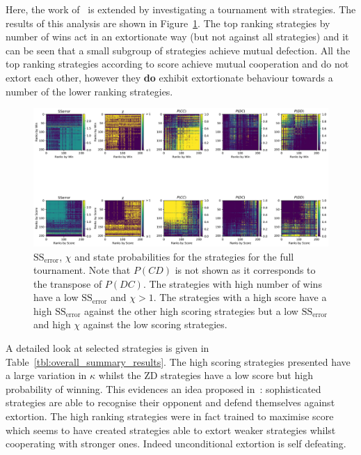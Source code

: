 \documentclass[a4paper]{article}
\newcommand{\SSe}{\text{SS}_{\text{error}}}
\begin{document}
Here, the work of~\cite{Stewart2012} is extended by investigating a tournament
with strategies. The
results of this analysis are shown in
Figure~\ref{fig:sse_chi_probabilities_in_full}. The top ranking strategies
by number of wins act in an extortionate way (but not against all strategies) and
it can be seen that a small subgroup of strategies achieve mutual defection.
All the top ranking strategies according to score achieve mutual cooperation and
do not extort each other, however they \textbf{do} exhibit extortionate
behaviour towards a number of the lower ranking strategies.

\begin{figure}[!htbp]
    \centering
    \includegraphics[width=.95\textwidth]{./assets/img/sse_chi_probabilities_in_full/main.pdf}
    \caption{\(\SSe\), \(\chi\) and state probabilities for the strategies for
        the full tournament. Note that \(P(CD)\) is not shown as it corresponds
        to the transpose of \(P(DC)\).  The strategies with high number of wins
        have a low \(\SSe\) and \(\chi>1\). The strategies with a high score
        have a high \(\SSe\) against the other high scoring strategies but a low
        \(\SSe\) and high \(\chi\) against the low scoring strategies.}
    \label{fig:sse_chi_probabilities_in_full}
\end{figure}

A detailed look at selected strategies is given in
Table~\ref{tbl:overall_summary_results}. The high scoring strategies presented
have a large variation in \(\kappa\) whilst the ZD strategies have a low score
but high probability of winning. This evidences an idea proposed
in~\cite{adami2013evolutionary}: sophisticated strategies are able to recognise
their opponent and defend themselves against extortion.
The high ranking strategies were in fact trained to maximise
score~\cite{Harper2017} which seems to have created strategies able to extort
weaker strategies whilst cooperating with stronger ones. Indeed unconditional
extortion is self defeating.
\end{document}
